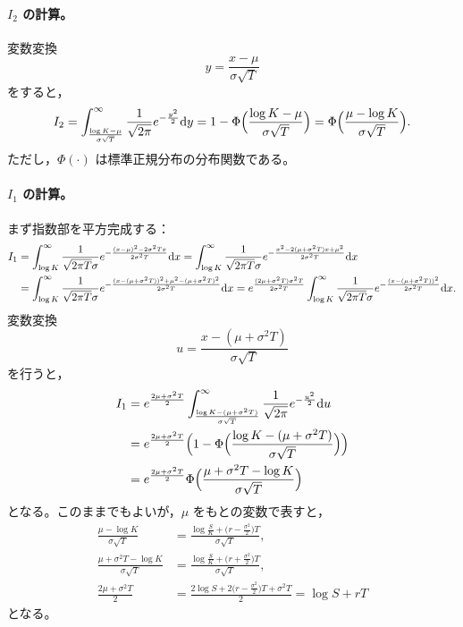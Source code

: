 \paragraph{$I_2$ の計算。}
変数変換
\[
y = \frac{x - \mu}{\sigma\sqrt{T}}
\]
をすると，
\begin{equation}
I_2 = \int_{\frac{\log K - \mu}{\sigma\sqrt{T}}}^{\infty}
\frac{1}{\sqrt{2\pi}}e^{-\frac{y^2}{2}}\mathrm{d} y
= 1 - \Phi\Bigl(\frac{\log K - \mu}{\sigma\sqrt{T}}\Bigr)
= \Phi\Bigl(\frac{\mu - \log K}{\sigma\sqrt{T}}\Bigr).
\end{equation}
ただし，$\Phi(\cdot)$ は標準正規分布の分布関数である。

\paragraph{$I_1$ の計算。}
まず指数部を平方完成する：
\begin{align}
I_1 &= \int_{\log K}^{\infty}\frac{1}{\sqrt{2\pi T}\sigma}
e^{-\frac{(x-\mu)^2 - 2\sigma^2Tx}{2\sigma^2T}}\mathrm{d} x
= \int_{\log K}^{\infty}\frac{1}{\sqrt{2\pi T}\sigma}
e^{-\frac{x^2 - 2(\mu+\sigma^2T)x + \mu^2}{2\sigma^2T}}\mathrm{d} x\notag\\
&= \int_{\log K}^{\infty}\frac{1}{\sqrt{2\pi T}\sigma}
e^{-\frac{(x-(\mu+\sigma^2T))^2 + \mu^2 - (\mu+\sigma^2T)^2}{2\sigma^2T}}\mathrm{d} x
= e^{\frac{(2\mu+\sigma^2T)\sigma^2T}{2\sigma^2T}}
\int_{\log K}^{\infty}\frac{1}{\sqrt{2\pi T}\sigma}
e^{-\frac{(x-(\mu+\sigma^2T))^2}{2\sigma^2T}}\mathrm{d} x.
\end{align}
変数変換
\[
u = \frac{x - (\mu + \sigma^2 T)}{\sigma\sqrt{T}}
\]
を行うと，
\begin{align}
I_1 &= e^{\frac{2\mu+\sigma^2T}{2}}
\int_{\frac{\log K - (\mu+\sigma^2T)}{\sigma\sqrt{T}}}^{\infty}
\frac{1}{\sqrt{2\pi}}e^{-\frac{u^2}{2}}\mathrm{d} u\notag\\
&= e^{\frac{2\mu+\sigma^2T}{2}}
\Bigl(1 - \Phi\Bigl(\frac{\log K - (\mu+\sigma^2T)}{\sigma\sqrt{T}}\Bigr)\Bigr)\notag\\
&= e^{\frac{2\mu+\sigma^2T}{2}}
\Phi\Bigl(\frac{\mu + \sigma^2T - \log K}{\sigma\sqrt{T}}\Bigr)
\end{align}
となる。このままでもよいが，$\mu$ をもとの変数で表すと，
\begin{align}
\frac{\mu - \log K}{\sigma\sqrt{T}}
&= \frac{\log\frac{S}{K} + \bigl(r - \frac{\sigma^2}{2}\bigr)T}{\sigma\sqrt{T}},\\
\frac{\mu + \sigma^2T - \log K}{\sigma\sqrt{T}}
&= \frac{\log\frac{S}{K} + \bigl(r + \frac{\sigma^2}{2}\bigr)T}{\sigma\sqrt{T}},\\
\frac{2\mu + \sigma^2 T}{2}
&= \frac{2\log S + 2\bigl(r-\frac{\sigma^2}{2}\bigr)T + \sigma^2T}{2}
= \log S + rT
\end{align}
となる。

